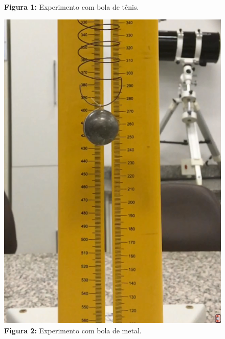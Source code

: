 \documentclass[a4paper, 12pt]{article}
\begin{document}
\begin{multicols}{2}
\begin{figure}[H]
				\captionsetup{labelformat=empty}
				\caption{\textbf{Figura 1:} Experimento com bola de tênis.}
			\end{figure}
			\begin{figure}[H]
				\centering
				\includegraphics[scale=0.3]{./img/bolaMetal.png}
				\captionsetup{labelformat=empty}
				\caption{\textbf{Figura 2:} Experimento com bola de metal.}
			\end{figure}
			

\end{multicols}
\end{document}
